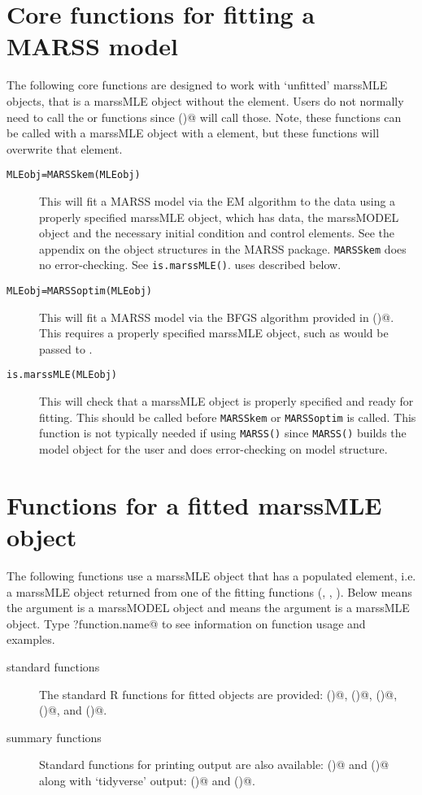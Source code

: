 \section{Core functions for fitting a MARSS model}
The following core functions are designed to work with `unfitted' marssMLE objects, that is a marssMLE object without the \verb@par@ element.  Users do not normally need to call the \verb@MARSSkem@ or \verb@MARSSoptim@ functions since \verb@MARSS()@ will call those. Note, these functions can be called with a marssMLE object with a \verb@par@ element, but these functions will overwrite that element.

\begin{description}
	\item[\texttt{MLEobj=MARSSkem(MLEobj)}] This will fit a MARSS model via the EM algorithm to the data using a properly specified marssMLE object, which has data, the marssMODEL object and the necessary initial condition and control elements.  See the appendix on the object structures in the MARSS package.  \texttt{MARSSkem}	does no error-checking.  See \texttt{is.marssMLE()}. \verb@MARSSkem@ uses \verb@MARSSkf@ described below.  
	\item[\texttt{MLEobj=MARSSoptim(MLEobj)}] This will fit a MARSS model via the BFGS algorithm provided in \verb@optim()@. This requires a properly specified marssMLE object, such as would be passed to \verb@MARSSkem@. 
	\item[\texttt{is.marssMLE(MLEobj)}] This will check that a marssMLE object is properly specified and ready for fitting.  This should be called before \texttt{MARSSkem} or \texttt{MARSSoptim} is called.  This function is not typically needed if using \texttt{MARSS()} since \texttt{MARSS()} builds the model object for the user and does error-checking on model structure.
\end{description}

\section{Functions for a fitted marssMLE object}
The following functions use a marssMLE object that has a populated \verb@par@ element, i.e. a marssMLE object returned from one of the fitting functions (\verb@MARSS@, \verb@MARSSkem@, \verb@MARSSoptim@).  Below \verb@MODELobj@ means the argument is a marssMODEL object and \verb@MLEobj@ means the argument is a marssMLE object.  Type \verb@?function.name@ to see information on function usage and examples.
\begin{description}
  \item[standard functions] The standard R functions for fitted objects are provided: \verb@residuals()@, \verb@fitted()@, \verb@logLik()@, \verb@AIC()@, and \verb@coef()@.
  \item[summary functions] Standard functions for printing output are also available: \verb@summary()@ and \verb@print()@ along with `tidyverse' output: \verb@tidy()@ and \verb@glance()@.
\end{description}

